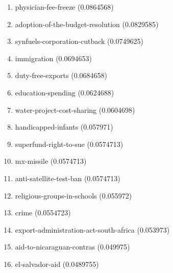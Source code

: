 \begin{enumerate}
\item physician-fee-freeze (0.0864568)
\item adoption-of-the-budget-resolution (0.0829585)
\item synfuels-corporation-cutback (0.0749625)
\item immigration (0.0694653)
\item duty-free-exports (0.0684658)
\item education-spending (0.0624688)
\item water-project-cost-sharing (0.0604698)
\item handicapped-infants (0.057971)
\item superfund-right-to-sue (0.0574713)
\item mx-missile (0.0574713)
\item anti-satellite-test-ban (0.0574713)
\item religious-groups-in-schools (0.055972)
\item crime (0.0554723)
\item export-administration-act-south-africa (0.053973)
\item aid-to-nicaraguan-contras (0.049975)
\item el-salvador-aid (0.0489755)
\end{enumerate}